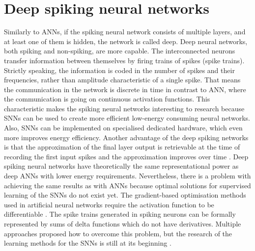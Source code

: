 \section{Deep spiking neural networks}
Similarly to ANNs, if the spiking neural network consists of multiple layers, and at least one of them is hidden, the network is called deep. Deep neural networks, both spiking and non-spiking, are more capable. The interconnected neurons transfer information between themselves by firing trains of spikes (spike trains). Strictly speaking, the information is coded in the number of spikes and their frequencies, rather than amplitude characteristic of a single spike. That means the communication in the network is discrete in time in contrast to ANN, where the communication is going on continuous activation functions. This characteristic makes the spiking neural networks interesting to research because SNNs can be used to create more efficient low-energy consuming neural networks. Also, SNNs can be implemented on specialised dedicated hardware, which even more improves energy efficiency. Another advantage of the deep spiking networks is that the approximation of the final layer output is retrievable at the time of recording the first input spikes and the approximation improves over time \cite{pfeifferDeepLearningSpiking2018}.
Deep spiking neural networks have theoretically the same representational power as deep ANNs with lower energy requirements. Nevertheless, there is a problem with achieving the same results as with ANNs because optimal solutions for supervised learning of the SNNs do not exist yet. The gradient-based optimisation methods used in artificial neural networks require the activation function to be differentiable \cite{tavanaeiDeepLearningSpiking2019}. The spike trains generated in spiking neurons can be formally represented by sums of delta functions which do not have derivatives. Multiple approaches proposed how to overcome this problem, but the research of the learning methods for the SNNs is still at its beginning \cite{tavanaeiDeepLearningSpiking2019}. 

